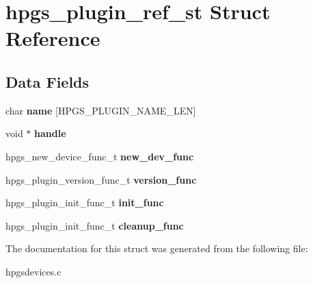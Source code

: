 \section{hpgs\_\-plugin\_\-ref\_\-st Struct Reference}
\label{structhpgs__plugin__ref__st}
\subsection*{Data Fields}
\begin{DoxyCompactItemize}
\item 
char {\bfseries name} [HPGS\_\-PLUGIN\_\-NAME\_\-LEN]\label{structhpgs__plugin__ref__st_acfa26290d30772283787cf1bb6627312}

\item 
void $\ast$ {\bfseries handle}\label{structhpgs__plugin__ref__st_a0c460da5f37861819af357f657841f79}

\item 
hpgs\_\-new\_\-device\_\-func\_\-t {\bfseries new\_\-dev\_\-func}\label{structhpgs__plugin__ref__st_a7ae184986a6c04a7a7671c55217ba074}

\item 
hpgs\_\-plugin\_\-version\_\-func\_\-t {\bfseries version\_\-func}\label{structhpgs__plugin__ref__st_a379f2990e3d80ec77504a8a82962203d}

\item 
hpgs\_\-plugin\_\-init\_\-func\_\-t {\bfseries init\_\-func}\label{structhpgs__plugin__ref__st_a87a689f411eb6ca99e18d7a2892b21e2}

\item 
hpgs\_\-plugin\_\-init\_\-func\_\-t {\bfseries cleanup\_\-func}\label{structhpgs__plugin__ref__st_afd5613b355752537671a62fc48265e2a}

\end{DoxyCompactItemize}


The documentation for this struct was generated from the following file:\begin{DoxyCompactItemize}
\item 
hpgsdevices.c\end{DoxyCompactItemize}
